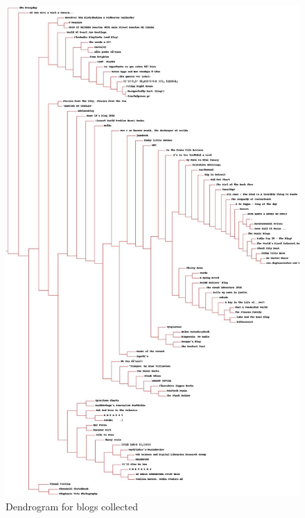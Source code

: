 \documentclass[letterpaper,11pt]{article}
\newcommand*{\srcPath}{../src}%
\begin{document}
 \begin{figure}[h]
 \centering
 \includegraphics[scale=0.26]{q2Dendrogram}
 \caption{Dendrogram for blogs collected}
 \label{fig:dendro}
 \end{figure}

\clearpage

 

\clearpage
\end{document}

